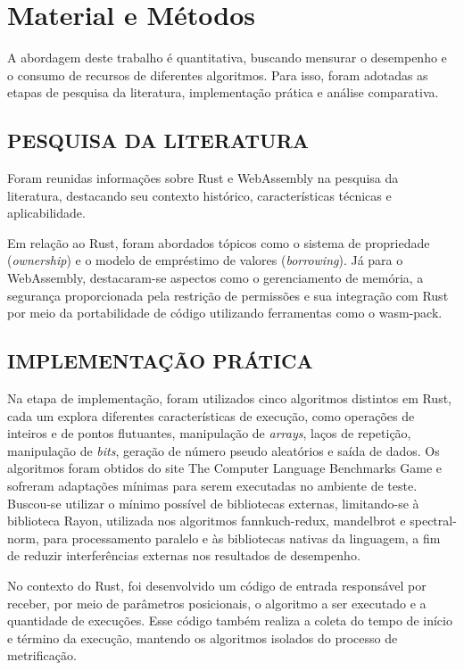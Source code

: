\chapter{Material e Métodos}

A abordagem deste trabalho é quantitativa, buscando mensurar o desempenho e o consumo de recursos de diferentes algoritmos. Para isso, foram adotadas as etapas de pesquisa da literatura, implementação prática e análise comparativa.

\section{PESQUISA DA LITERATURA}

Foram reunidas informações sobre Rust e WebAssembly na pesquisa da literatura, destacando seu contexto histórico, características técnicas e aplicabilidade.

Em relação ao Rust, foram abordados tópicos como o sistema de propriedade (\emph{ownership}) e o modelo de empréstimo de valores (\emph{borrowing}). Já para o WebAssembly, destacaram-se aspectos como o gerenciamento de memória, a segurança proporcionada pela restrição de permissões e sua integração com Rust por meio da portabilidade de código utilizando ferramentas como o wasm-pack.

\section{IMPLEMENTAÇÃO PRÁTICA}

Na etapa de implementação, foram utilizados cinco algoritmos distintos em Rust, cada um explora diferentes características de execução, como operações de inteiros e de pontos flutuantes, manipulação de \emph{arrays}, laços de repetição, manipulação de \emph{bits}, geração de número pseudo aleatórios e saída de dados. Os algoritmos foram obtidos do site The Computer Language Benchmarks Game \cite{bench2026} e sofreram adaptações mínimas para serem executadas no ambiente de teste. Buscou-se utilizar o mínimo possível de bibliotecas externas, limitando-se à biblioteca Rayon, utilizada nos algoritmos fannkuch-redux, mandelbrot e spectral-norm, para processamento paralelo e às bibliotecas nativas da linguagem, a fim de reduzir interferências externas nos resultados de desempenho.

No contexto do Rust, foi desenvolvido um código de entrada responsável por receber, por meio de parâmetros posicionais, o algoritmo a ser executado e a quantidade de execuções. Esse código também realiza a coleta do tempo de início e término da execução, mantendo os algoritmos isolados do processo de metrificação.

